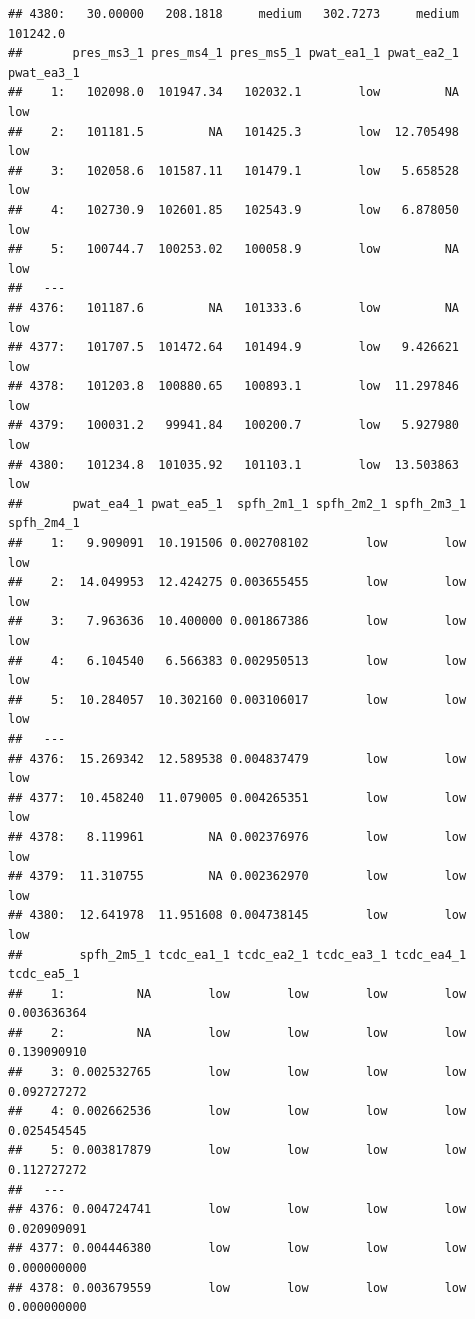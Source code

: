 \documentclass[
  11pt,
  a4paper,
]{article}
\begin{document}
\begin{verbatim}
## 4380:   30.00000   208.1818     medium   302.7273     medium   101242.0
##       pres_ms3_1 pres_ms4_1 pres_ms5_1 pwat_ea1_1 pwat_ea2_1 pwat_ea3_1
##    1:   102098.0  101947.34   102032.1        low         NA        low
##    2:   101181.5         NA   101425.3        low  12.705498        low
##    3:   102058.6  101587.11   101479.1        low   5.658528        low
##    4:   102730.9  102601.85   102543.9        low   6.878050        low
##    5:   100744.7  100253.02   100058.9        low         NA        low
##   ---                                                                  
## 4376:   101187.6         NA   101333.6        low         NA        low
## 4377:   101707.5  101472.64   101494.9        low   9.426621        low
## 4378:   101203.8  100880.65   100893.1        low  11.297846        low
## 4379:   100031.2   99941.84   100200.7        low   5.927980        low
## 4380:   101234.8  101035.92   101103.1        low  13.503863        low
##       pwat_ea4_1 pwat_ea5_1  spfh_2m1_1 spfh_2m2_1 spfh_2m3_1 spfh_2m4_1
##    1:   9.909091  10.191506 0.002708102        low        low        low
##    2:  14.049953  12.424275 0.003655455        low        low        low
##    3:   7.963636  10.400000 0.001867386        low        low        low
##    4:   6.104540   6.566383 0.002950513        low        low        low
##    5:  10.284057  10.302160 0.003106017        low        low        low
##   ---                                                                   
## 4376:  15.269342  12.589538 0.004837479        low        low        low
## 4377:  10.458240  11.079005 0.004265351        low        low        low
## 4378:   8.119961         NA 0.002376976        low        low        low
## 4379:  11.310755         NA 0.002362970        low        low        low
## 4380:  12.641978  11.951608 0.004738145        low        low        low
##        spfh_2m5_1 tcdc_ea1_1 tcdc_ea2_1 tcdc_ea3_1 tcdc_ea4_1  tcdc_ea5_1
##    1:          NA        low        low        low        low 0.003636364
##    2:          NA        low        low        low        low 0.139090910
##    3: 0.002532765        low        low        low        low 0.092727272
##    4: 0.002662536        low        low        low        low 0.025454545
##    5: 0.003817879        low        low        low        low 0.112727272
##   ---                                                                    
## 4376: 0.004724741        low        low        low        low 0.020909091
## 4377: 0.004446380        low        low        low        low 0.000000000
## 4378: 0.003679559        low        low        low        low 0.000000000

\end{verbatim}
\end{document}
